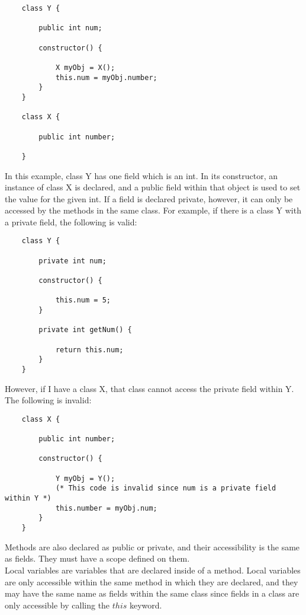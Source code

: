 \begin{homeworkProblem}
	\begin{verbatim}
	class Y {
		
		public int num;
		
		constructor() {
			
			X myObj = X();
			this.num = myObj.number;
		}
	}
	
	class X {
		
		public int number;
		
	}
	\end{verbatim}
	
	In this example, class Y has one field which is an int. In its constructor, an instance of class X is declared, and a public field within that object is used to set the value for the given int. If a field is declared private, however, it can only be accessed by the methods in the same class. For example, if there is a class Y with a private field, the following is valid:
	
	\begin{verbatim}
	class Y {
		
		private int num;
		
		constructor() {
			
			this.num = 5;
		}
		
		private int getNum() {
			
			return this.num;
		}
	}
	\end{verbatim}
		
		However, if I have a class X, that class cannot access the private field within Y. The following is invalid:
	\begin{verbatim}
	class X {
	
		public int number;
	
		constructor() {
	
			Y myObj = Y();
			(* This code is invalid since num is a private field within Y *)
			this.number = myObj.num;  
		}
	}
	\end{verbatim}

	Methods are also declared as public or private, and their accessibility is the same as fields. They must have a scope defined on them. \\
	
	Local variables are variables that are declared inside of a method. Local variables are only accessible within the same method in which they are declared, and they may have the same name as fields within the same class since fields in a class are only accessible by calling the $this$ keyword.\\
		
\end{homeworkProblem}